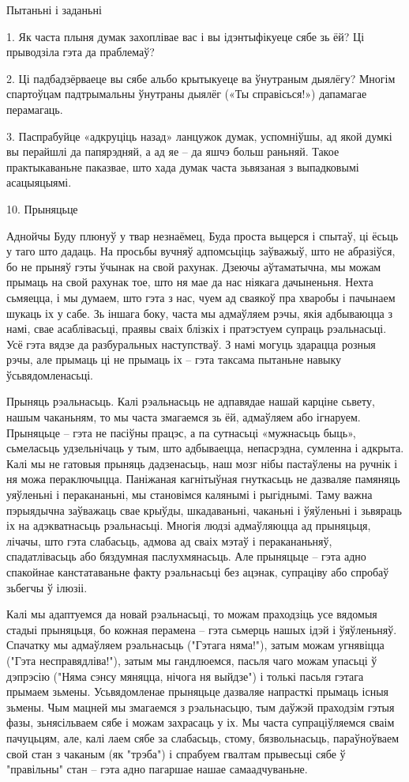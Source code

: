 Пытаньні і заданьні

1. Як часта плыня думак захоплівае вас і вы ідэнтыфікуеце сябе зь ёй? Ці прыводзіла гэта да праблемаў?

2. Ці падбадзёрваеце вы сябе альбо крытыкуеце ва ўнутраным дыялёгу? Многім спартоўцам падтрымальны ўнутраны дыялёг («Ты справісься!») дапамагае перамагаць.

3. Паспрабуйце «адкруціць назад» ланцужок думак, успомніўшы, ад якой думкі вы перайшлі да папярэдняй, а ад яе – да яшчэ больш раньняй. Такое практыкаваньне паказвае, што хада думак часта зьвязаная з выпадковымі асацыяцыямі.


10. Прыняцьце

Аднойчы Буду плюнуў у твар незнаёмец, Буда проста выцерся і спытаў, ці ёсьць у таго што дадаць. На просьбы вучняў адпомсьціць заўважыў, што не абразіўся, бо не прыняў гэты ўчынак на свой рахунак. Дзеючы аўтаматычна, мы можам прымаць на свой рахунак тое, што ня мае да нас ніякага дачыненьня. Нехта сьмяецца, і мы думаем, што гэта з нас, чуем ад сваякоў пра хваробы і пачынаем шукаць іх у сабе. Зь іншага боку, часта мы адмаўляем рэчы, якія адбываюцца з намі, свае асаблівасьці, праявы сваіх блізкіх і пратэстуем супраць рэальнасьці. Усё гэта вядзе да разбуральных наступстваў. З намі могуць здарацца розныя рэчы, але прымаць ці не прымаць іх – гэта таксама пытаньне навыку ўсьвядомленасьці.

Прыняць рэальнасьць. Калі рэальнасьць не адпавядае нашай карціне сьвету, нашым чаканьням, то мы часта змагаемся зь ёй, адмаўляем або ігнаруем. Прыняцьце – гэта не пасіўны працэс, а па сутнасьці «мужнасьць быць», сьмеласьць удзельнічаць у тым, што адбываецца, непасрэдна, сумленна і адкрыта. Калі мы не гатовыя прыняць дадзенасьць, наш мозг нібы пастаўлены на ручнік і ня можа пераключыцца. Паніжаная кагнітыўная гнуткасьць не дазваляе памяняць уяўленьні і перакананьні, мы становімся калянымі і рыгіднымі. Таму важна пэрыядычна заўважаць свае крыўды, шкадаваньні, чаканьні і ўяўленьні і зьвяраць іх на адэкватнасьць рэальнасьці. Многія людзі адмаўляюцца ад прыняцьця, лічачы, што гэта слабасьць, адмова ад сваіх мэтаў і перакананьняў, спадатлівасьць або бяздумная паслухмянасьць. Але прыняцьце – гэта адно спакойнае канстатаваньне факту рэальнасьці без ацэнак, супраціву або спробаў зьбегчы ў ілюзіі.

Калі мы адаптуемся да новай рэальнасьці, то можам праходзіць усе вядомыя стадыі прыняцьця, бо кожная перамена – гэта сьмерць нашых ідэй і ўяўленьняў. Спачатку мы адмаўляем рэальнасьць ("Гэтага няма!"), затым можам угнявіцца ("Гэта несправядліва!"), затым мы гандлюемся, пасьля чаго можам упасьці ў дэпрэсію ("Няма сэнсу мяняцца, нічога ня выйдзе") і толькі пасьля гэтага прымаем зьмены. Усьвядомленае прыняцьце дазваляе напрасткі прымаць існыя зьмены. Чым мацней мы змагаемся з рэальнасьцю, тым даўжэй праходзім гэтыя фазы, зьнясільваем сябе і можам захрасаць у іх. Мы часта супраціўляемся сваім пачуцьцям, але, калі лаем сябе за слабасьць, стому, бязвольнасьць, параўноўваем свой стан з чаканым (як "трэба") і спрабуем гвалтам прывесьці сябе ў "правільны" стан – гэта адно пагаршае нашае самаадчуваньне.

